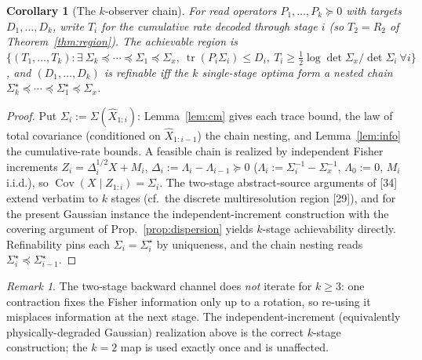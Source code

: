 \documentclass[lettersize,onecolumn]{IEEEtran}
\newtheorem{corollary}{Corollary}
\theoremstyle{definition}
\theoremstyle{remark}
\newtheorem*{remark}{Remark}
\newcommand{\tr}{\operatorname{tr}}
\newcommand{\Cov}{\operatorname{Cov}}
\begin{document}
\begin{corollary}[The $k$-observer chain]\label{cor:kobs}
For read operators $P_1,\dots,P_k\succeq0$ with targets $D_1,\dots,D_k$, write $T_i$ for
the \emph{cumulative} rate decoded through stage $i$ (so $T_2=R_2$ of
Theorem~\ref{thm:region}). The achievable region is
$\{(T_1,\dots,T_k):\exists\ \Sigma_k\preceq\cdots\preceq\Sigma_1\preceq\Sigma_x,\
\tr(P_i\Sigma_i)\le D_i,\ T_i\ge\tfrac12\log\det\Sigma_x/\det\Sigma_i\ \forall i\}$, and
$(D_1,\dots,D_k)$ is refinable iff the $k$ single-stage optima form a nested chain
$\Sigma_k^\star\preceq\cdots\preceq\Sigma_1^\star\preceq\Sigma_x$.
\end{corollary}
\begin{proof}
Put $\Sigma_i:=\Sigma(\hat X_{1:i})$: Lemma~\ref{lem:cm} gives each trace bound, the law
of total covariance (conditioned on $\hat X_{1:i-1}$) the chain nesting, and
Lemma~\ref{lem:info} the cumulative-rate bounds. A feasible chain is realized by
independent Fisher increments $Z_i=\Delta_i^{1/2}X+M_i$, $\Delta_i:=\Lambda_i-
\Lambda_{i-1}\succeq0$ ($\Lambda_i:=\Sigma_i^{-1}-\Sigma_x^{-1}$, $\Lambda_0:=0$, $M_i$
i.i.d.), so $\Cov(X\mid Z_{1:i})=\Sigma_i$. The two-stage abstract-source arguments of
[34] extend verbatim to $k$ stages (cf.\ the discrete multiresolution
region [29]), and for the present Gaussian instance the independent-increment
construction with the covering argument of Prop.~\ref{prop:dispersion} yields $k$-stage
achievability directly. Refinability pins each
$\Sigma_i=\Sigma_i^\star$ by uniqueness, and the chain nesting reads $\Sigma_i^\star
\preceq\Sigma_{i-1}^\star$.
\end{proof}
\begin{remark}
The two-stage backward channel does \emph{not} iterate for $k\ge3$: one contraction fixes
the Fisher information only up to a rotation, so re-using it misplaces information at the
next stage. The independent-increment (equivalently physically-degraded Gaussian)
realization above is the correct $k$-stage construction; the $k=2$ map is used exactly
once and is unaffected.
\end{remark}
\end{document}
